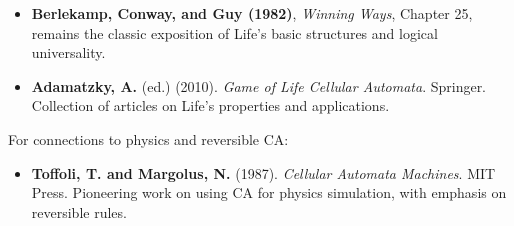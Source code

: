 \begin{itemize}
\item \textbf{Berlekamp, Conway, and Guy (1982)}, \textit{Winning Ways}, Chapter 25, remains the classic exposition of Life's basic structures and logical universality.
\end{itemize}

\begin{itemize}
\item \textbf{Adamatzky, A.} (ed.) (2010). \textit{Game of Life Cellular Automata}. Springer. Collection of articles on Life's properties and applications.
\end{itemize}

For connections to physics and reversible CA:

\begin{itemize}
\item \textbf{Toffoli, T. and Margolus, N.} (1987). \textit{Cellular Automata Machines}. MIT Press. Pioneering work on using CA for physics simulation, with emphasis on reversible rules.
\end{itemize}
